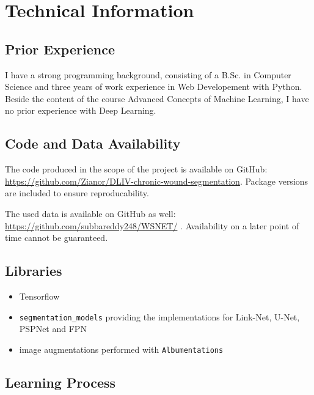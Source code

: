 \section{Technical Information}

\subsection{Prior Experience}

I have a strong programming background, consisting of a B.Sc. in Computer Science and three years of work experience in Web Developement with Python. Beside the content of the course Advanced Concepts of Machine Learning, I have no prior experience with Deep Learning.

\subsection{Code and Data Availability}

The code produced in the scope of the project is available on GitHub: \url{https://github.com/Zianor/DLIV-chronic-wound-segmentation}. Package versions are included to ensure reproducability.

The used data is available on GitHub as well: \url{https://github.com/subbareddy248/WSNET/} \cite{Oota_2021_WACV, Oota_2023_WACV}. Availability on a later point of time cannot be guaranteed.

\subsection{Libraries}

\begin{itemize}
	\item Tensorflow
	\item \texttt{segmentation\_models} \cite{SegmentationModels} providing the implementations for Link-Net, U-Net, PSPNet and FPN
	\item image augmentations performed with \texttt{Albumentations} \cite{albumentations}
\end{itemize}

\subsection{Learning Process}

